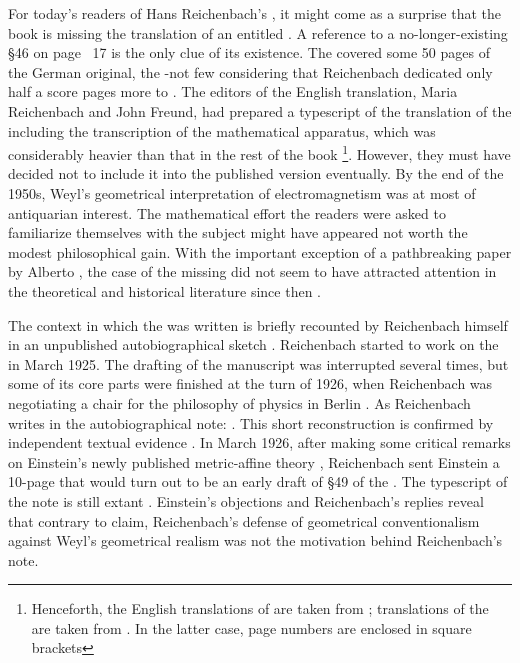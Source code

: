 \documentclass[final]{article}
\newcommand{\PRZL}{\citetitle{Reichenbach1928}\xspace}
\begin{document}
For today's readers of Hans Reichenbach's  \citep{Reichenbach1958}, it might come as a surprise that the book is missing the translation of an \Ap entitled . A reference to a no-longer-existing \S46 on page ~17 is the only clue of its existence. The \Ap covered some 50 pages of the German original, the \PRZL \citep{Reichenbach1928}-not few considering that Reichenbach dedicated only half a score pages more to \gr. The editors of the English translation, Maria Reichenbach and John Freund, had prepared a typescript of the translation of the \Ap \citep[041-2101]{HR} including the transcription of the mathematical apparatus, which was considerably heavier than that in the rest of the book \footnote{Henceforth, the English translations of \PRZL are taken from \cite{Reichenbach1958}; translations of the \Ap are taken from \cite[041-2101]{HR}. In the latter case, page numbers are enclosed in square brackets}. However, they must have decided not to include it into the published version eventually. By the end of the 1950s, Weyl's geometrical interpretation of electromagnetism was at most of antiquarian interest. The mathematical effort the readers were asked to familiarize themselves with the subject might have appeared not worth the modest philosophical gain. With the important exception of a pathbreaking paper by Alberto \citet{Coffa1979}, the case of the missing \Ap did not seem to have attracted attention in the theoretical and historical literature since then .

The context in which the \Ap was written is briefly recounted by Reichenbach himself in an unpublished autobiographical sketch \citep[044-06-25]{HR}. Reichenbach started to work on the \PRZL in March 1925. The drafting of the manuscript was interrupted several times, but some of its core parts were finished at the turn of 1926, when Reichenbach was negotiating a chair for the philosophy of physics in Berlin \citep{Hecht1982}. As Reichenbach writes in the autobiographical note:  \citep[044-06-25]{HR}. This short reconstruction is confirmed by independent textual evidence . In March 1926, after making some critical remarks on Einstein's newly published metric-affine theory \citep{Einstein1925a}, Reichenbach sent Einstein a 10-page  that would turn out to be an early draft of \S49 of the \Ap. The typescript of the note is still extant \citep[025-05-10]{HR}. Einstein's objections and Reichenbach's replies reveal that contrary to  claim, Reichenbach's defense of geometrical conventionalism against Weyl's geometrical realism  was not the motivation behind Reichenbach's note.
\end{document}
